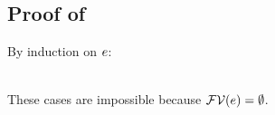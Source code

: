 \subsection*{Proof of }

By induction on $e$:

\begin{bycase}

\Case{$\var$}
\begin{derivation}
\step{\var=\varI}{\hyp\ $\varI\in\efvar{\var}$}
\step{\varII\not\in\efvar{\exprI}\IMPLIES\cvarv{\exprI}{\varII}=\emptyset}
     {}
\steP
{\cvarv{\esbsO{\var}}{\varII}
 \cvarv{\exprI}{\varII}
 \linK{=}
 \emptyset\cup\cond{\varII\in\efvar{\exprI}}
                   {\cvarv{\exprI}{\varII}}
                   {\cvarv{\exprI}{\varII}}
 \cond{\varII\neq\varI}{\emptyset}{\emptyset}
  \cup
   \cond{\varII\in\efvar{\exprI}}{\cvarv{\exprI}{\varII}}{\emptyset}
 \link{=}{$\cvarv{\var}{\varII}=\cvarv{\var}{\varI}=\emptyset$}
 \cond{\varII\neq\varI}{\cvarv{\var}{\varII}}{\emptyset}
  \cup
   \cond{\varII\in\efvar{\exprI}}
        {\cvarv{\var}{\varI}\cup\cvarv{\exprI}{\varII}}
        {\emptyset}}
\end{derivation}

\Case{$\opO$, $\descopO$, $\pjop{\fnam}$}\\
These cases are impossible because $\mathcal{FV}(e)=\emptyset$.


\end{bycase}
